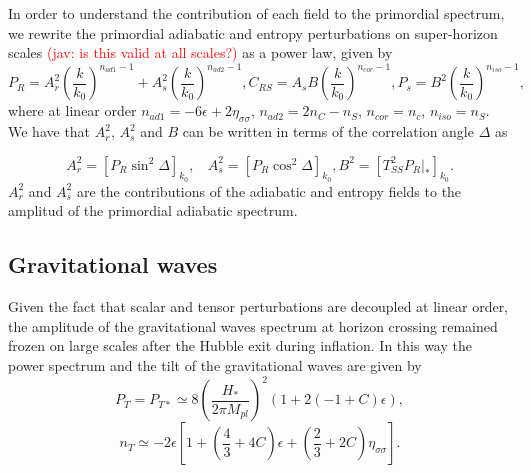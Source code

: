 \documentclass[amssymb,twocolumn,prd,nofootinbib,showpacs]{revtex4-1}
\newcommand{\jav}[1]{\textcolor{red}{(jav: #1)}}
\begin{document}
In order to understand the contribution of each field to the primordial spectrum, we rewrite the primordial adiabatic 
and entropy perturbations on super-horizon scales \jav{is this valid at all scales?} as a power law, given by
\begin{subequations}\label{PswAs}
\begin{equation}\label{PrAs}
P_R=A_r^2\left(\frac{k}{k_0}\right)^{n_{ad1}-1}+A_s^2\left(\frac{k}{k_0}\right)^{n_{ad2}-1},
\end{equation}
\begin{equation}\label{PrCrs}
C_{RS}=A_sB\left(\frac{k}{k_0}\right)^{n_{cor}-1},
\end{equation}
\begin{equation}\label{PsAs}
P_s=B^2\left(\frac{k}{k_0}\right)^{n_{iso}-1},
\end{equation}
\end{subequations}
where at linear order $n_{ad1}=-6\epsilon+2\eta_{\sigma\sigma}$, $n_{ad2}=2n_C-n_S$, 
$n_{cor}=n_c$, $n_{iso}=n_S$. We have that $A_r^2$, $A_s^2$ and $B$ can be written in 
terms of the correlation angle $\Delta$ as

\begin{subequations}
\label{RelAs}
\begin{equation}
A_r^2=[P_R\sin^2\Delta]_{k_0}, \ \ \ \ A_s^2=[P_R\cos^2\Delta]_{k_0},
\end{equation}
\begin{equation}
B^2=[T_{SS}^2 P_R|_*]_{k_0}.
\end{equation}
\end{subequations}
$A_r^2$ and $A_s^2$ are the contributions of the adiabatic and entropy fields to the amplitud 
of the primordial adiabatic spectrum. 

\subsection{Gravitational waves}

Given the fact that scalar and tensor perturbations are decoupled at linear order, the amplitude of 
the gravitational waves spectrum at horizon crossing 
remained frozen on large scales after the Hubble exit during inflation. 
In this way the power spectrum and the tilt of the gravitational waves are given by
\begin{equation}
P_T=P_{T*}\simeq 8 \left(\frac{H_*}{2\pi M_{pl}}\right)^2(1+2(-1+C)\epsilon),
\end{equation}
\begin{equation}\label{tiltsnt}
n_T\simeq -2\epsilon\left[1+\left(\frac{4}{3}+4C\right)\epsilon+\left(\frac{2}{3}+2C\right)\eta_{\sigma\sigma}\right].
\end{equation}
\end{document}
